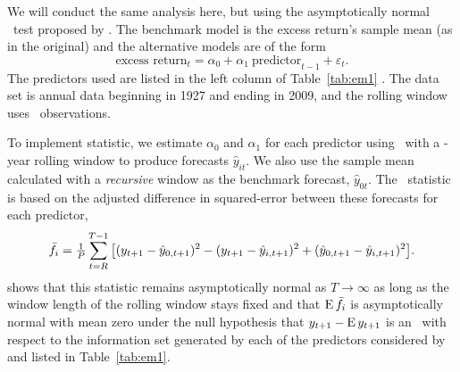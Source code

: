 \documentclass[12pt,fleqn]{article}
\begin{document}
We will conduct the same analysis here, but using the asymptotically
normal \mds\ test proposed by \cite{Cal:15}.  The benchmark model is
the excess return's sample mean (as in the original) and the
alternative models are of the form
\begin{equation}\label{eq:29}
  \text{excess return}_{t} = \alpha_{0} +
  \alpha_{1}\ \text{predictor}_{t-1} + \varepsilon_{t}.
\end{equation}
The predictors used are listed in the left
column of Table~\ref{tab:em1} \citep[see][for a detailed description
of the variables]{GoW:08}. The data set is annual data beginning in
1927 and ending in 2009, and the rolling window uses \windowlength\
observations.

To implement  statistic, we estimate $\alpha_0$ and
$\alpha_1$ for each predictor using \ols\ with a \windowlength-year
rolling window to produce forecasts $\hat y_{it}$. We also use the
sample mean calculated with a \emph{recursive} window as the benchmark
forecast, $\hat y_{0t}$. The \oos\ statistic is based on the adjusted
difference in squared-error between these forecasts for each
predictor,
\begin{equation*}
  \bar f_i = \tfrac{1}{P} \sum_{t=R}^{T-1}
  \big[(y_{t+1} - \hat y_{0,t+1})^2 - (y_{t+1} - \hat y_{i,t+1})^2 +
  (\hat y_{0,t+1} - \hat y_{i,t+1})^2 \big].
\end{equation*}
\citet{Cal:15} shows that this statistic remains asymptotically normal
as $T \to \infty$ as long as the window length of the rolling window
stays fixed and that $\operatorname{E} \bar f_i$ is asymptotically normal with mean zero
under the null hypothesis that $y_{t+1} - \operatorname{E} y_{t+1}$ is an \mds\ with
respect to the information set generated by each of the predictors
considered by \citet{GoW:08} and listed in Table~\ref{tab:em1}.
\end{document}
